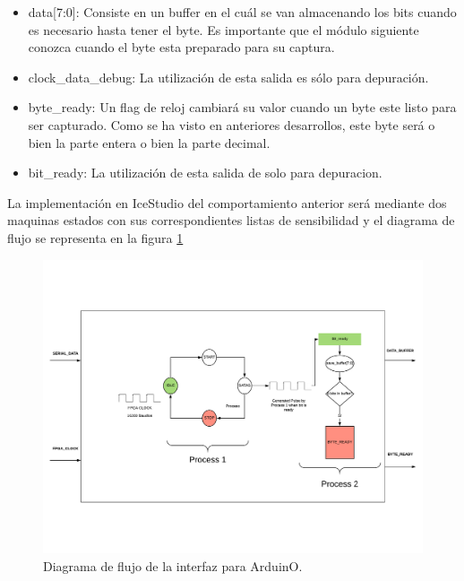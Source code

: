 \begin{itemize}
	\item data[7:0]: Consiste en un buffer en el cuál se van almacenando los bits cuando es necesario hasta tener el byte. Es importante que el módulo siguiente conozca cuando el byte esta preparado para su captura.
	\item clock\_data\_debug: La utilización de esta salida es sólo para depuración.
	\item byte\_ready: Un flag de reloj cambiará su valor cuando un byte este listo para ser capturado. Como se ha visto en anteriores desarrollos, este byte será o bien la parte entera o bien la parte decimal.
	\item bit\_ready: La utilización de esta salida de solo para depuracion.
\end{itemize} 

La implementación en IceStudio del comportamiento anterior será mediante dos maquinas estados con sus correspondientes listas de sensibilidad y el diagrama de flujo se representa en la figura \ref{fig:arduino_interfacefluid}

\begin{center}
\begin{figure}[H]
	\center
	\includegraphics[trim = 0mm 0mm 0mm 0mm, clip,scale=0.9, angle=90]{imagenes/Balancing_robot/arduino_interfacefluid.pdf}
	\caption{Diagrama de flujo de la interfaz para ArduinO.}
	\label{fig:arduino_interfacefluid}
\end{figure}
\end{center}



